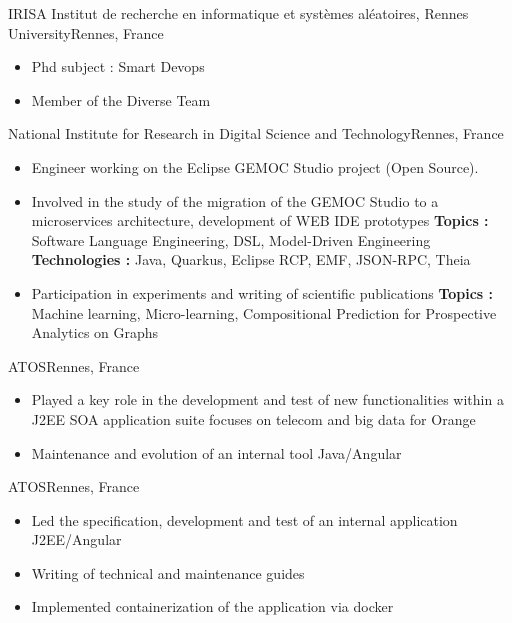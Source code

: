 {IRISA Institut de recherche en informatique et systèmes aléatoires, Rennes University}{Rennes, France}
{
\begin{itemize}
    \item Phd subject : Smart Devops 
    \item Member of the Diverse Team
\end{itemize}
 }
{National Institute for Research in Digital Science and Technology}{Rennes, France}
{\begin{itemize}
\item Engineer working on the Eclipse GEMOC Studio project (Open Source). 
\item {Involved in the study of the migration of the GEMOC Studio to a microservices architecture, development of WEB IDE prototypes \newline \textbf{Topics :} Software Language Engineering, DSL, Model-Driven Engineering
\newline \textbf{Technologies :} Java, Quarkus, Eclipse RCP, EMF, JSON-RPC, Theia}
\item Participation in experiments and writing of scientific publications
\newline\textbf{Topics :} Machine learning, Micro-learning, Compositional Prediction for Prospective Analytics on Graphs
\end{itemize}}
{ATOS}{Rennes, France}
{
\begin{itemize}
\item Played a key role in the development and test of new functionalities within a J2EE SOA application suite focuses on telecom and big data for Orange
\item Maintenance and evolution of an internal tool Java/Angular
\end{itemize}
}
{ATOS}{Rennes, France}
{\begin{itemize}
\item Led the specification, development and test of an internal application J2EE/Angular
\item Writing of technical and maintenance guides
\item Implemented containerization of the application via docker
\end{itemize}}